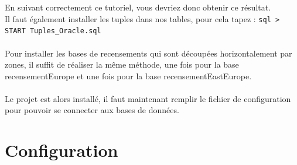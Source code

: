 \documentclass[12pt]{article}
\begin{document}
	\indent En suivant correctement ce tutoriel, vous devriez donc obtenir ce résultat. \\
	\indent Il faut également installer les tuples dans nos tables, pour cela tapez : \texttt{sql > START Tuples\_Oracle.sql}
	\\
	\\
	\indent Pour installer les bases de recensements qui sont découpées horizontalement par zones, il suffit de réaliser la même méthode, une fois pour la base recensementEurope et une fois pour la base recensementEastEurope. \\
	\\
	\indent Le projet est alors installé, il faut maintenant remplir le fichier de configuration pour pouvoir se connecter aux bases de données.
	
\section{Configuration}
\end{document}
